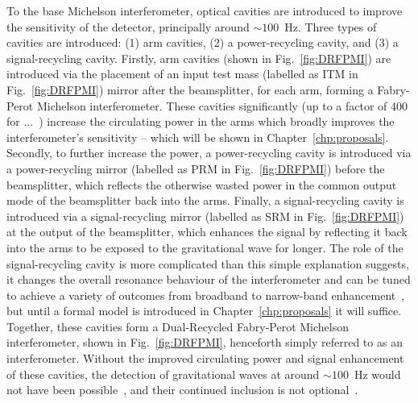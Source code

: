 To the base Michelson interferometer, optical cavities are introduced to improve the sensitivity of the detector, principally around $\sim100$~Hz. Three types of cavities are introduced: (1) arm cavities, (2) a power-recycling cavity, and (3) a signal-recycling cavity. 
Firstly, arm cavities (shown in Fig.~\ref{fig:DRFPMI}) are introduced via the placement of an input test mass (labelled as ITM in Fig.~\ref{fig:DRFPMI}) mirror after the beamsplitter, for each arm, forming a Fabry-Perot Michelson interferometer. These cavities significantly (up to a factor of 400 for ...~\cite{}) increase the circulating power in the arms which broadly improves the interferometer's sensitivity -- which will be shown in Chapter~\ref{chp:proposals}. 
Secondly, to further increase the power, a power-recycling cavity is introduced via a power-recycling mirror (labelled as PRM in Fig.~\ref{fig:DRFPMI}) before the beamsplitter, which reflects the otherwise wasted power in the common output mode of the beamsplitter back into the arms. 
Finally, a signal-recycling cavity is introduced via a signal-recycling mirror (labelled as SRM in Fig.~\ref{fig:DRFPMI}) at the output of the beamsplitter, which enhances the signal by reflecting it back into the arms to be exposed to the gravitational wave for longer. The role of the signal-recycling cavity is more complicated than this simple explanation suggests, it changes the overall resonance behaviour of the interferometer and can be tuned to achieve a variety of outcomes from broadband to narrow-band enhancement~\cite{}, but until a formal model is introduced in Chapter~\ref{chp:proposals} it will suffice. 
Together, these cavities form a Dual-Recycled Fabry-Perot Michelson interferometer, shown in Fig.~\ref{fig:DRFPMI}, henceforth simply referred to as an interferometer. Without the improved circulating power and signal enhancement of these cavities, the detection of gravitational waves at around $\sim100$~Hz would not have been possible~\cite{}, and their continued inclusion is not optional~\cite{}.

